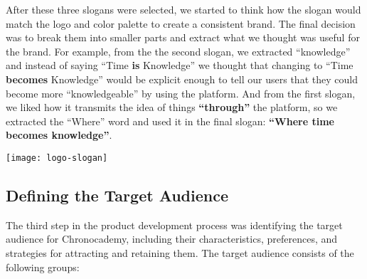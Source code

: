 After these three slogans were selected, we started to think how the slogan would match the logo and color palette to create a consistent brand.
The final decision was to break them into smaller parts and extract what we thought was useful for the brand.
For example, from the the second slogan, we extracted ``knowledge'' and instead of saying ``Time \textbf{is} Knowledge'' we thought that changing to ``Time \textbf{becomes} Knowledge'' would be explicit enough to tell our users that they could become more ``knowledgeable'' by using the platform.
And from the first slogan, we liked how it transmits the idea of things \textbf{``through''} the platform, so we extracted the ``Where'' word and used it in the final slogan: \textbf{``Where time becomes knowledge''}.
\begin{center}
    \texttt{[image: logo-slogan]}
\end{center}

\subsection{Defining the Target Audience}\label{subsec:target-audience}

The third step in the product development process was identifying the target audience for Chronocademy, including their characteristics, preferences, and strategies for attracting and retaining them.
The target audience consists of the following groups:

